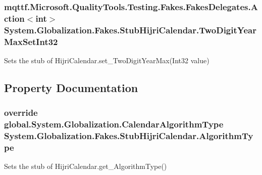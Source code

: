 \hypertarget{class_system_1_1_globalization_1_1_fakes_1_1_stub_hijri_calendar_a744edba9e3f39489425fc0ec07fdf80f}{
\subsubsection[{Two\-Digit\-Year\-Max\-Set\-Int32}]{\setlength{\rightskip}{0pt plus 5cm}mqttf.\-Microsoft.\-Quality\-Tools.\-Testing.\-Fakes.\-Fakes\-Delegates.\-Action$<$int$>$ System.\-Globalization.\-Fakes.\-Stub\-Hijri\-Calendar.\-Two\-Digit\-Year\-Max\-Set\-Int32}}\label{class_system_1_1_globalization_1_1_fakes_1_1_stub_hijri_calendar_a744edba9e3f39489425fc0ec07fdf80f}


Sets the stub of Hijri\-Calendar.\-set\-\_\-\-Two\-Digit\-Year\-Max(\-Int32 value)



\subsection{Property Documentation}
\hypertarget{class_system_1_1_globalization_1_1_fakes_1_1_stub_hijri_calendar_a53b8a06816b3f01933f69bd5f34f079a}{
\subsubsection[{Algorithm\-Type}]{\setlength{\rightskip}{0pt plus 5cm}override global.\-System.\-Globalization.\-Calendar\-Algorithm\-Type System.\-Globalization.\-Fakes.\-Stub\-Hijri\-Calendar.\-Algorithm\-Type\hspace{0.3cm}{\ttfamily [get]}}}\label{class_system_1_1_globalization_1_1_fakes_1_1_stub_hijri_calendar_a53b8a06816b3f01933f69bd5f34f079a}


Sets the stub of Hijri\-Calendar.\-get\-\_\-\-Algorithm\-Type()


